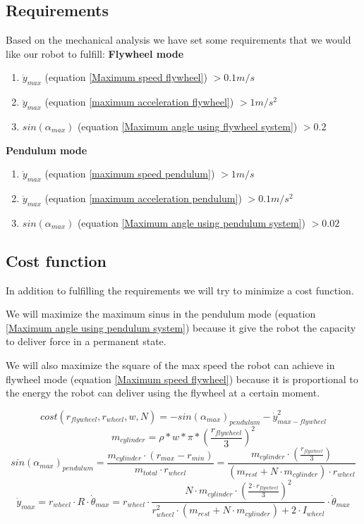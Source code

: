 \subsection{Requirements}
Based on the mechanical analysis we have set some requirements that we would like our robot to
fulfill:
\textbf{Flywheel mode}
\begin{enumerate}
	\item $\dot{y}_{max}$ (equation \ref{Maximum speed flywheel}) $> 0.1m/s$
	\item $\ddot{y}_{max}$ (equation \ref{maximum acceleration flywheel}) $> 1m/s^2$
	\item $sin(\alpha_{max})$ (equation \ref{Maximum angle using flywheel system}) $> 0.2$
\end{enumerate}
\textbf{Pendulum mode}
\begin{enumerate}
	\item $\dot{y}_{max}$ (equation \ref{maximum speed pendulum}) $> 1m/s$
	\item $\ddot{y}_{max}$ (equation \ref{maximum acceleration pendulum}) $>0.1m/s^2$
	\item $sin(\alpha_{max})$ (equation \ref{Maximum angle using pendulum system}) $> 0.02$
\end{enumerate}
	


\subsection{Cost function}
In addition to fulfilling the requirements we will try to minimize a cost function.

We will maximize the maximum sinus in the pendulum mode 
(equation \ref{Maximum angle using pendulum system}) because
it give the robot the capacity to deliver force in a permanent state.

We will also maximize the square of the max speed the robot can achieve
in flywheel mode (equation \ref{Maximum speed flywheel}) because it is
proportional to the energy the robot can deliver using the flywheel at a certain moment.

\begin{equation}
	cost(r_{flywheel},r_{wheel},w,N) = - sin(\alpha_{max})_{pendulum} -\dot{y}^2_{max-flywheel}
	\label{eq: cost}
\end{equation}
\begin{equation*}
	m_{cylinder} = \rho * w * \pi * (\frac{r_{flywheel}}{3})^2
\end{equation*}
\begin{equation*}
	sin(\alpha_{max})_{pendulum} = \frac{m_{cylinder} \cdot  (r_{max} - r_{min})}{m_{total} \cdot r_{wheel}} = \frac{m_{cylinder} \cdot  (\frac{r_{flywheel}}{3})}{(m_{rest} + N \cdot m_{cylinder})\cdot r_{wheel}} 	
\end{equation*}
\begin{equation*}
	\dot{y}_{max} = r_{wheel} \cdot  R \cdot  \dot{\theta}_{max} =r_{wheel} \cdot  \frac{ N \cdot  m_{cylinder} \cdot  (\frac{2\cdot r_{flywheel}}{3})^2}
    {r_{wheel}^2\cdot (m_{rest} + N \cdot m_{cylinder}) +  2\cdot I_{wheel}} \cdot  \dot{\theta}_{max}
\end{equation*}


